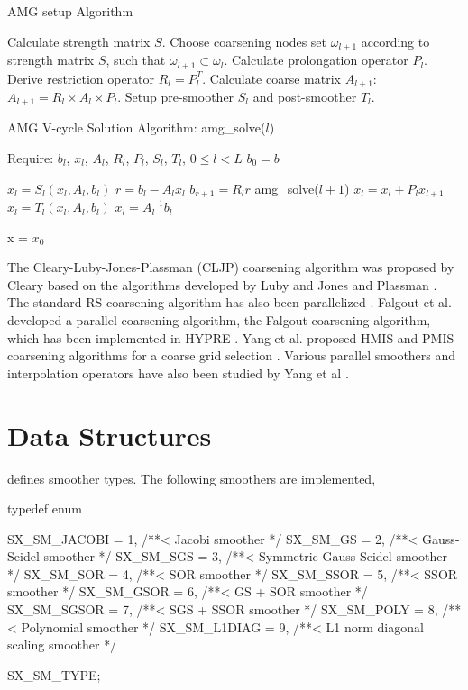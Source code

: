 \begin{algorithm}[!htb]
\caption{AMG setup Algorithm} \label{alg-amg-setup}
\begin{algorithmic}[1]
  \State Calculate strength matrix $S$.
  \State Choose coarsening nodes set $\omega_{l+1}$ according to strength matrix $S$, such that $\omega_{l+1} \subset \omega_{l}$.
  \State Calculate prolongation operator $P_l$.
  \State Derive restriction operator $R_l = P_l^T$.
  \State Calculate coarse matrix $A_{l+1}$: $A_{l+1} = R_l \times A_l \times P_l$.
  \State Setup pre-smoother $S_l$ and post-smoother $T_l$.
\end{algorithmic}
\end{algorithm}

\begin{algorithm}[!htb]
\caption{AMG V-cycle Solution Algorithm: amg\_solve($l$)} \label{alg-amg-solve}
\begin{algorithmic}%
\State Require: $b_l$, $x_l$, $A_l$, $R_l$, $P_l$, $S_l$, $T_l$, $0 \leq l < L$
\State
\State $b_0 = b$

  \State $x_l = S_l(x_l, A_l, b_l)$
  \State $r = b_l - A_lx_l$
  \State $b_{r+1} = R_lr$
  \State amg\_solve($l+1$)
  \State $x_l = x_l + P_l x_{l+1}$
  \State $x_l = T_l(x_l, A_l, b_l)$
\Else
  \State $x_l = A_l^{-1}b_l$
\EndIf

\State x = $x_0$

\end{algorithmic}
\end{algorithm}

The Cleary-Luby-Jones-Plassman (CLJP) coarsening
algorithm was proposed by Cleary \cite{cljp1} based on the algorithms developed
by Luby \cite{cljp3} and Jones and Plassman \cite{cljp2}. The standard RS coarsening algorithm
has also been parallelized \cite{HYPRE2}. Falgout et al. developed a parallel coarsening algorithm,
the Falgout coarsening algorithm, which has been implemented in HYPRE \cite{HYPRE2}. Yang et al. proposed
HMIS and PMIS coarsening algorithms for a coarse grid selection \cite{pmis}. Various parallel smoothers
and interpolation operators have also been studied by Yang et al \cite{HYPRE2,pmis}.

\section{Data Structures}

 defines smoother types. The following smoothers are implemented,
\begin{evb}
typedef enum
{
    SX_SM_JACOBI    = 1,  /**< Jacobi smoother */
    SX_SM_GS        = 2,  /**< Gauss-Seidel smoother */
    SX_SM_SGS       = 3,  /**< Symmetric Gauss-Seidel smoother */
    SX_SM_SOR       = 4,  /**< SOR smoother */
    SX_SM_SSOR      = 5,  /**< SSOR smoother */
    SX_SM_GSOR      = 6,  /**< GS + SOR smoother */
    SX_SM_SGSOR     = 7,  /**< SGS + SSOR smoother */
    SX_SM_POLY      = 8,  /**< Polynomial smoother */
    SX_SM_L1DIAG    = 9,  /**< L1 norm diagonal scaling smoother */

} SX_SM_TYPE;
\end{evb}

